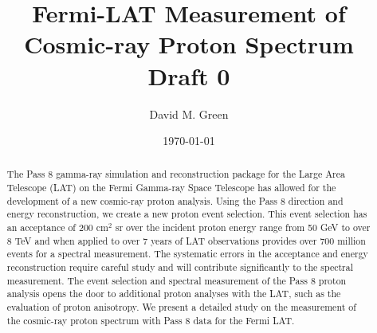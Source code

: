 \documentclass{article}
\title{Fermi-LAT Measurement of Cosmic-ray Proton Spectrum \\ Draft 0}
\author{David M. Green}
\date{\today}
\begin{document}
\maketitle

\begin{abstract}
The Pass 8 gamma-ray simulation and reconstruction package for the Large Area Telescope (LAT) on the Fermi Gamma-ray Space Telescope has allowed for the development of a new cosmic-ray proton analysis. 
Using the Pass 8 direction and energy reconstruction, we create a new proton event selection. 
This event selection has an acceptance of 200 cm$^2$ sr over the incident proton energy range from 50 GeV to over 8 TeV and when applied to over 7 years of LAT observations provides over 700 million events for a spectral measurement. 
The systematic errors in the acceptance and energy reconstruction require careful study and will contribute significantly to the spectral measurement.
The event selection and spectral measurement of the Pass 8 proton analysis opens the door to additional proton analyses with the LAT, such as the evaluation of proton anisotropy. 
We present a detailed study on the measurement of the cosmic-ray proton spectrum with Pass 8 data for the Fermi LAT.
\end{abstract}








\end{document}

